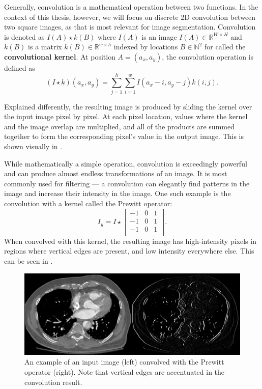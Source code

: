 Generally, convolution is a mathematical operation between two functions. In the context of this thesis, however, we will focus on discrete 2D convolution between two square images, as that is most relevant for image segmentation. Convolution is denoted as $I(A) \star k(B)$ where $I(A)$ is an image $I(A) \in \mathbb{R}^{W \times H}$ and $k(B)$ is a matrix $k(B) \in \mathbb{R}^{w \times h}$ indexed by locations $B \in \mathbb{N}^2$ for called the \textbf{convolutional kernel}. At position $A = (a_x, a_y)$, the convolution operation is defined as
\begin{equation}
(I \star k)(a_x, a_y) = \sum_{j=1}^{h} \sum_{i=1}^{w} I(a_x - i, a_y - j) k(i, j).
\end{equation}

Explained differently, the resulting image is produced by sliding the kernel over the input image pixel by pixel. At each pixel location, values where the kernel and the image overlap are multiplied, and all of the products are summed together to form the corresponding pixel's value in the output image. This is shown visually in .

While mathematically a simple operation, convolution is exceedingly powerful and can produce almost endless transformations of an image. It is most commonly used for filtering --- a convolution can elegantly find patterns in the image and increase their intensity in the image. One such example is the convolution with a kernel called the Prewitt operator:
\begin{equation}
I_y = I \star \begin{bmatrix}
-1 & 0 & 1\\
-1 & 0 & 1\\
-1 & 0 & 1\\
\end{bmatrix}.
\end{equation}
When convolved with this kernel, the resulting image has high-intensity pixels in regions where vertical edges are present, and low intensity everywhere else. This can be seen in .

\begin{figure}[b!]
 \centering
 \includegraphics[width=\linewidth]{images/prewitt-example.png}
 \caption{An example of an input image (left) convolved with the Prewitt operator (right). Note that vertical edges are accentuated in the convolution result.}
 \label{fig:prewitt-example}
 \end{figure}

